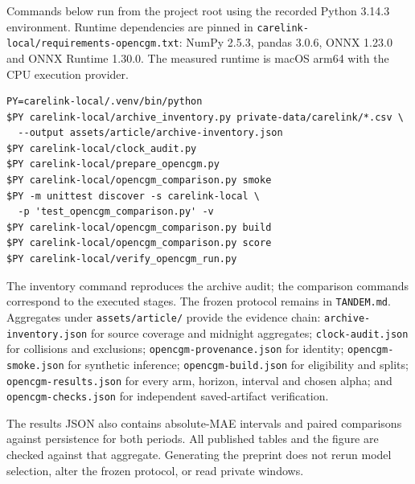 \documentclass[11pt,letterpaper]{article}
\begin{document}
Commands below run from the project root using the recorded Python
3.14.3 environment. Runtime dependencies are pinned in
{\ttfamily\nolinkurl{carelink-local/requirements-opencgm.txt}}: NumPy 2.5.3, pandas
3.0.6, ONNX 1.23.0 and ONNX Runtime 1.30.0. The measured runtime is
macOS arm64 with the CPU execution provider.

\begin{verbatim}
PY=carelink-local/.venv/bin/python
$PY carelink-local/archive_inventory.py private-data/carelink/*.csv \
  --output assets/article/archive-inventory.json
$PY carelink-local/clock_audit.py
$PY carelink-local/prepare_opencgm.py
$PY carelink-local/opencgm_comparison.py smoke
$PY -m unittest discover -s carelink-local \
  -p 'test_opencgm_comparison.py' -v
$PY carelink-local/opencgm_comparison.py build
$PY carelink-local/opencgm_comparison.py score
$PY carelink-local/verify_opencgm_run.py
\end{verbatim}

The inventory command reproduces the archive audit; the comparison
commands correspond to the executed stages. The frozen protocol remains
in \texttt{TANDEM.md}. Aggregates under \texttt{assets/article/} provide
the evidence chain: {\ttfamily\nolinkurl{archive-inventory.json}} for source coverage
and midnight aggregates; \texttt{clock-audit.json} for collisions and
exclusions; {\ttfamily\nolinkurl{opencgm-provenance.json}} for identity;
\texttt{opencgm-smoke.json} for synthetic inference;
\texttt{opencgm-build.json} for eligibility and splits;
\texttt{opencgm-results.json} for every arm, horizon, interval and
chosen alpha; and \texttt{opencgm-checks.json} for independent
saved-artifact verification.

The results JSON also contains absolute-MAE intervals and paired
comparisons against persistence for both periods. All published tables
and the figure are checked against that aggregate. Generating the
preprint does not rerun model selection, alter the frozen protocol, or
read private windows.
\end{document}
